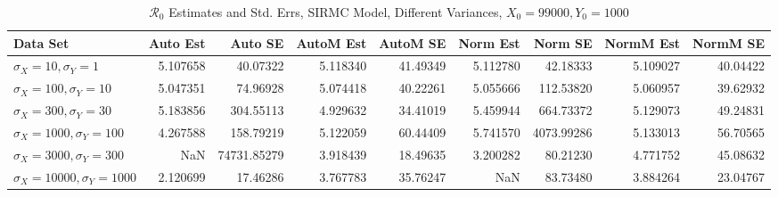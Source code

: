 \documentclass[12pt]{article}
\newcommand{\rr}{\ensuremath{\mathcal{R}_0}}
\begin{document}
\begin{table}[H]
	
	\caption{$\rr$ Estimates and Std. Errs, SIRMC Model,
		Different Variances, 
		$X_0 = 99000, Y_0 = 1000$}
	\begin{footnotesize}
		\hskip -1.7cm
		\begin{tabular}{l|r|r|r|r|r|r|r|r}
			\hline
			Data Set & Auto Est & Auto SE & AutoM Est & AutoM SE & Norm Est & Norm SE & NormM Est & NormM SE\\
			\hline
			$\sigma_X = 10, \sigma_Y = 1$ & 5.107658 & 40.07322 & 5.118340 & 41.49349 & 5.112780 & 42.18333 & 5.109027 & 40.04422\\
			\hline
			$\sigma_X = 100, \sigma_Y = 10$ & 5.047351 & 74.96928 & 5.074418 & 40.22261 & 5.055666 & 112.53820 & 5.060957 & 39.62932\\
			\hline
			$\sigma_X = 300, \sigma_Y = 30$ & 5.183856 & 304.55113 & 4.929632 & 34.41019 & 5.459944 & 664.73372 & 5.129073 & 49.24831\\
			\hline
			$\sigma_X = 1000, \sigma_Y = 100$ & 4.267588 & 158.79219 & 5.122059 & 60.44409 & 5.741570 & 4073.99286 & 5.133013 & 56.70565\\
			\hline
			$\sigma_X = 3000, \sigma_Y = 300$ & NaN & 74731.85279 & 3.918439 & 18.49635 & 3.200282 & 80.21230 & 4.771752 & 45.08632\\
			\hline
			$\sigma_X = 10000, \sigma_Y = 1000$ & 2.120699 & 17.46286 & 3.767783 & 35.76247 & NaN & 83.73480 & 3.884264 & 23.04767\\
			\hline
		\end{tabular}
	\end{footnotesize}
\end{table}
\end{document}
